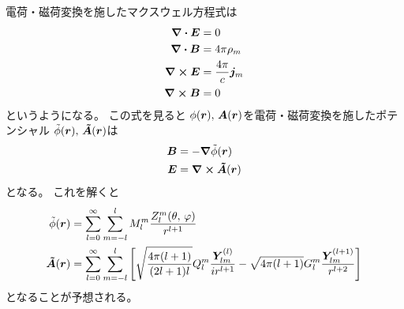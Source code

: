 \documentclass[../../master.tex]{subfiles}
\begin{document}
電荷・磁荷変換を施したマクスウェル方程式は
\begin{align}
    \div \vb*{E} &= 0\\
    \div \vb*{B} &= 4\pi \rho_m\\
    \curl \vb*{E} &= \frac{4\pi}{c}\vb*{j}_m\\
    \curl \vb*{B} &= 0
\end{align}
というようになる。
この式を見ると
\(\phi(\vb*{r}),\,\vb*{A}(\vb*{r})\)を電荷・磁荷変換を施したポテンシャル
\(\tilde{\phi}(\vb*{r}),\,\vb*{\tilde{A}}(\vb*{r})\)は
\begin{align}
    \vb*{B} &= -\grad{\tilde{\phi}(\vb*{r})}\\
    \vb*{E} &= \curl \vb*{\tilde{A}}(\vb*{r})
\end{align}
となる。
これを解くと
\begin{align}
    \tilde{\phi}(\vb*{r})
    &= \sum_{l=0}^{\infty} \sum_{m=-l}^{l} M_l^m \frac{Z_l^m(\theta,\,\varphi)}{r^{l+1}}\\
    \vb*{\tilde{A}}(\vb*{r})
    &= \sum_{l=0}^{\infty} \sum_{m=-l}^{l}\qty[
        \sqrt{\frac{4\pi(l+1)}{(2l+1)l}}Q_l^m \frac{\vb*{Y}_{lm}^{(l)}}{ir^{l+1}}
        -\sqrt{4\pi(l+1)} G_l^m \frac{\vb*{Y}_{lm}^{(l+1)}}{r^{l+2}}
    ]
\end{align}
となることが予想される。
\end{document}
